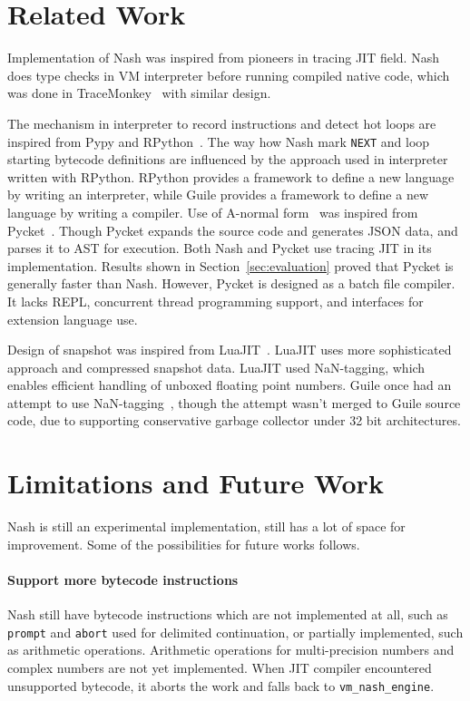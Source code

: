 \documentclass[preprint, 10pt]{sigplanconf}
\begin{document}
\section{Related Work}
\label{sec:related}
Implementation of Nash was inspired from pioneers in tracing JIT field. Nash
does type checks in VM interpreter before running compiled native code, which
was done in TraceMonkey~\cite{gal2009trace} with similar design.

The mechanism in interpreter to record instructions and detect hot loops are
inspired from Pypy and RPython~\cite{bolz2009tracing}. The way how Nash mark
\texttt{NEXT} and loop starting bytecode definitions are influenced by the
approach used in interpreter written with RPython.  RPython provides a framework
to define a new language by writing an interpreter, while Guile provides a
framework to define a new language by writing a compiler.  Use of A-normal
form~\cite{flanagan1993essence} was inspired from
Pycket~\cite{bauman2015pycket}. Though Pycket expands the source code and
generates JSON data, and parses it to AST for execution. Both Nash and Pycket
use tracing JIT in its implementation. Results shown in
Section~\ref{sec:evaluation} proved that Pycket is generally faster than Nash.
However, Pycket is designed as a batch file compiler. It lacks REPL, concurrent
thread programming support, and interfaces for extension language use.

Design of snapshot was inspired from LuaJIT~\cite{pall2009ip}. LuaJIT uses more
sophisticated approach and compressed snapshot data. LuaJIT used NaN-tagging,
which enables efficient handling of unboxed floating point numbers. Guile once
had an attempt to use NaN-tagging~\cite{wingo2011value}, though the attempt
wasn't merged to Guile source code, due to supporting conservative garbage
collector under 32 bit architectures.

\section{Limitations and Future Work}
\label{sec:future}

Nash is still an experimental implementation, still has a lot of space for
improvement. Some of the possibilities for future works follows.

\paragraph{Support more bytecode instructions} Nash still have bytecode
instructions which are not implemented at all, such as \texttt{prompt} and
\texttt{abort} used for delimited continuation, or partially implemented, such
as arithmetic operations. Arithmetic operations for multi-precision numbers and
complex numbers are not yet implemented. When JIT compiler encountered
unsupported bytecode, it aborts the work and falls back to
\texttt{vm\_nash\_engine}.
\end{document}
